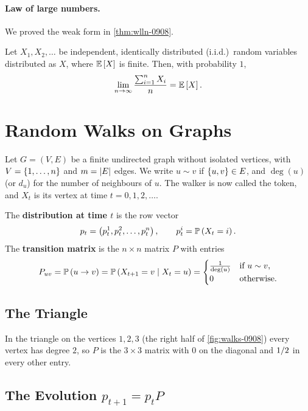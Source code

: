 
\paragraph{Law of large numbers.} We proved the weak form in \cref{thm:wlln-0908}.

\begin{theorem}\label{thm:slln-0910}
    Let $X_1, X_2, \dots$ be independent, identically distributed (i.i.d.)\ random variables
    distributed as $X$, where $\operatorname{\mathbb{E}}\left[X\right]$ is finite. Then, with probability $1$,
    \[\lim_{n \to \infty} \frac{\sum_{i=1}^{n} X_i}{n} = \operatorname{\mathbb{E}}\left[X\right].\]
\end{theorem}

\section{Random Walks on Graphs}

Let $G = (V, E)$ be a finite undirected graph without isolated vertices, with
$V = \left\lbrace1, \dots, n\right\rbrace$ and $m = \left\lvert E\right\rvert$ edges. We write $u \sim v$ if $\left\lbrace u,v\right\rbrace \in E$, and
$\deg(u)$ (or $d_u$) for the number of neighbours of $u$. The walker is now called the token, and
$X_t$ is its vertex at time $t = 0, 1, 2, \dots$.

\begin{definition}\label{def:walk-0910}
    The \textbf{distribution at time $t$} is the row vector
    \[p_t = \left(p_t^1, p_t^2, \dots, p_t^n\right), \qquad p_t^i = \operatorname{\mathbb{P}}\left(X_t = i\right).\]
    The \textbf{transition matrix} is the $n \times n$ matrix $P$ with entries
    \[P_{uv} = \operatorname{\mathbb{P}}\left(u \to v\right) = \operatorname{\mathbb{P}}\left(X_{t+1} = v \mid X_t = u\right)
        = \begin{cases}
            \frac{1}{\deg(u)} & \text{if } u \sim v, \\
            0                 & \text{otherwise.}
        \end{cases}\]
\end{definition}

\subsection{The Triangle}

In the triangle on the vertices $1, 2, 3$ (the right half of \cref{fig:walks-0908}) every vertex has
degree $2$, so $P$ is the $3 \times 3$ matrix with $0$ on the diagonal and $1/2$ in every
other entry.

\subsection{The Evolution \texorpdfstring{$p_{t+1} = p_t P$}{p(t+1) = p(t) P}}

